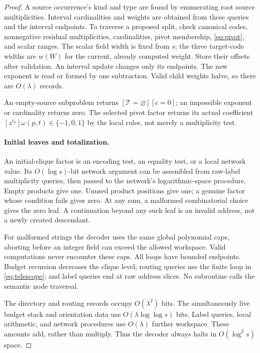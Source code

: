\documentclass[11pt]{article}
\theoremstyle{definition}
\theoremstyle{remark}
\begin{document}
\begin{proof}
A source occurrence's kind and type are found by enumerating root source multiplicities. Interval cardinalities and weights are obtained from these queries and the interval endpoints. To traverse a proposed split, check canonical codes, nonnegative residual multiplicities, cardinalities, pivot membership, \eqref{eq:pivot}, and scalar ranges. The scalar field width is fixed from $s$; the three target-code widths are $w(W)$ for the current, already computed weight. Store their offsets after validation. An interval update changes only its endpoints. The new exponent is read or formed by one subtraction. Valid child weights halve, so there are $O(\lambda)$ records.

An empty-source subproblem returns $[\mathcal T=\varnothing][c=0]$; an impossible exponent or cardinality returns zero. The selected pivot factor returns its actual coefficient $[z^{c_0}]\omega(p,t)\in\{-1,0,1\}$ by the local rules, not merely a multiplicity test.

\paragraph{Initial leaves and totalization.}
An initial-clique factor is an encoding test, an equality test, or a local network value. Its $O(\log s)$-bit network argument can be assembled from raw-label multiplicity queries, then passed to the network's logarithmic-space procedure. Empty products give one. Unused product positions give one; a genuine factor whose condition fails gives zero. At any sum, a malformed combinatorial choice gives the zero leaf. A continuation beyond any such leaf is an invalid address, not a newly created descendant.

For malformed strings the decoder uses the same global polynomial caps, aborting before an integer field can exceed the allowed workspace. Valid computations never encounter these caps. All loops have bounded endpoints. Budget recursion decreases the clique level; routing queries use the finite loop in \eqref{eq:telescope}; and label queries end at raw address slices. No subroutine calls the semantic node traversal.

The directory and routing records occupy $O(\lambda^2)$ bits. The simultaneously live budget stack and orientation data use $O(\lambda\log\log s)$ bits. Label queries, local arithmetic, and network procedures use $O(\lambda)$ further workspace. These amounts add, rather than multiply. Thus the decoder always halts in $O(\log^2s)$ space.
\end{proof}
\end{document}
